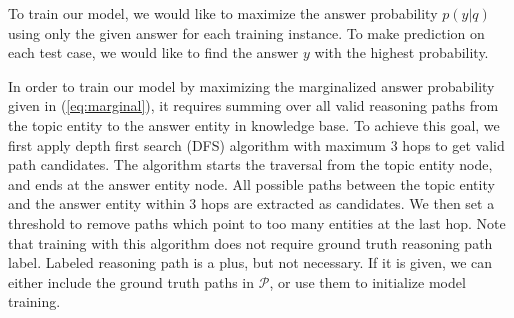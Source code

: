 To train our model, we would like to maximize the answer probability $p(y|q)$ using only the given answer for each training instance. To make prediction on each test case, we would like to find the answer $y$ with the highest probability.

In order to train our model by maximizing the marginalized answer probability given in (\ref{eq:marginal}), it requires summing over all valid reasoning paths from the topic entity to the answer entity in knowledge base. To achieve this goal, we first apply depth first search (DFS) algorithm with maximum 3 hops to get valid path candidates. The algorithm starts the traversal from the topic entity node, and ends at the answer entity node. All possible paths between the topic entity and the answer entity within 3 hops are extracted as candidates. We then set a threshold to remove paths which point to too many entities at the last hop. Note that training with this algorithm does not require ground truth reasoning path label. Labeled reasoning path is a plus, but not necessary. If it is given, we can either include the ground truth paths in $\mathcal{P}$, or use them to initialize model training.

